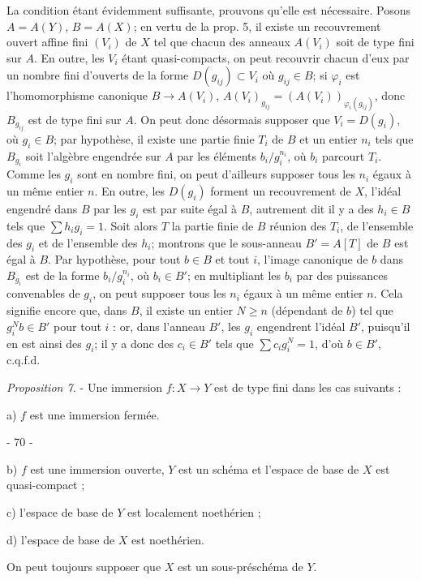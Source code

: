 La condition étant évidemment suffisante, prouvons qu'elle est nécessaire. Posons $A=A(Y)$, $B=A(X)$; en vertu de la prop. 5, il existe un recouvrement ouvert affine fini $(V_i)$ de $X$ tel que chacun des anneaux $A(V_i)$ soit de type fini sur $A$. En outre, les $V_i$ étant quasi-compacts, on peut recouvrir chacun d'eux par un nombre fini d'ouverts de la forme $D(g_{ij}) \subset V_i$ où $g_{ij} \in B$; si $\varphi_i$ est l'homomorphisme canonique $B \to A(V_i)$, $A(V_i)_{g_{ij}} = (A(V_i))_{\varphi_i(g_{ij})}$, donc $B_{g_{ij}}$ est de type fini sur $A$. On peut donc désormais supposer que $V_i = D(g_i)$, où $g_i \in B$; par hypothèse, il existe une partie finie $T_i$ de $B$ et un entier $n_i$ tels que $B_{g_i}$ soit l'algèbre engendrée sur $A$ par les éléments $b_i/g_i^{n_i}$, où $b_i$ parcourt $T_i$. Comme les $g_i$ sont en nombre fini, on peut d'ailleurs supposer tous les $n_i$ égaux à un même entier $n$. En outre, les $D(g_i)$ forment un recouvrement de $X$, l'idéal engendré dans $B$ par les $g_i$ est par suite égal à $B$, autrement dit il y a des $h_i \in B$ tels que $\sum h_i g_i = 1$. Soit alors $T$ la partie finie de $B$ réunion des $T_i$, de l'ensemble des $g_i$ et de l'ensemble des $h_i$; montrons que le sous-anneau $B' = A[T]$ de $B$ est égal à $B$. Par hypothèse, pour tout $b \in B$ et tout $i$, l'image canonique de $b$ dans $B_{g_i}$ est de la forme $b_i/g_i^{n_i}$, où $b_i \in B'$; en multipliant les $b_i$ par des puissances convenables de $g_i$, on peut supposer tous les $n_i$ égaux à un même entier $n$. Cela signifie encore que, dans $B$, il existe un entier $N \geqslant n$ (dépendant de $b$) tel que $g_i^N b \in B'$ pour tout $i$ : or, dans l'anneau $B'$, les $g_i$ engendrent l'idéal $B'$, puisqu'il en est ainsi des $g_i$; il y a donc des $c_i \in B'$ tels que $\sum c_i g_i^N = 1$, d'où $b \in B'$, c.q.f.d.

\emph{Proposition 7.} - Une immersion $f : X \to Y$ est de type fini dans les cas suivants :

a) $f$ est une immersion fermée.

\newpage


- 70 -

b) $f$ est une immersion ouverte, $Y$ est un schéma et l'espace de base de $X$ est quasi-compact ;

c) l'espace de base de $Y$ est localement noethérien ;

d) l'espace de base de $X$ est noethérien.

On peut toujours supposer que $X$ est un sous-préschéma de $Y$.

